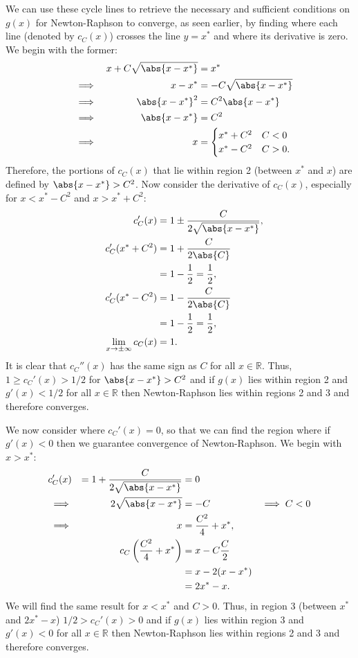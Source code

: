 \documentclass{book}
\begin{document}
We can use these cycle lines to retrieve the necessary and sufficient conditions on $g(x)$ for Newton-Raphson to converge, as seen earlier, by finding where each line (denoted by $c_C(x)$) crosses the line $y=x^*$ and where its derivative is zero.
We begin with the former:
\begin{align*}
&& && x + C \sqrt{\abs{x - x^*}} & = x^* \\
&& \implies && x - x^*           & = -C \sqrt{\abs{x - x^*}} \\
&& \implies && \abs{x - x^*}^2   & = C^2 \abs{x - x^*} \\
&& \implies && \abs{x - x^*}     & = C^2 \\
&& \implies && x                 & = \begin{cases} x^* + C^2 & C < 0 \\ x^* - C^2 & C > 0. \end{cases}
\end{align*}
Therefore, the portions of $c_C(x)$ that lie within region 2 (between $x^*$ and $x$) are defined by $\abs{x - x^*} > C^2$.
Now consider the derivative of $c_C(x)$, especially for $x < x^*-C^2$ and $x > x^* + C^2$:
\begin{align*}
&& c_C'(x) & = 1 \pm \frac{C}{2 \sqrt{\abs{x-x^*}}}, \\
&& c_C'(x^* + C^2) & = 1 + \frac{C}{2 \abs{C}} \\
&&                 & = 1 - \frac{1}{2} = \frac{1}{2}, \\
&& c_C'(x^* - C^2) & = 1 - \frac{C}{2 \abs{C}} \\
&&                 & = 1 - \frac{1}{2} = \frac{1}{2}, \\
&& \lim_{x \rightarrow \pm \infty} c_C(x)  & = 1 .
\end{align*}
It is clear that $c_C''(x)$ has the same sign as $C$ for all $x \in \mathbb{R}$.
Thus, $1 \geq c_C'(x) > 1/2$ for $\abs{x - x^*} > C^2$ and if $g(x)$ lies within region 2 and $g'(x) < 1/2$ for all $x \in \mathbb{R}$ then Newton-Raphson lies within regions 2 and 3 and therefore converges.

We now consider where $c_C'(x) = 0$, so that we can find the region where if $g'(x) < 0$ then we guarantee convergence of Newton-Raphson.
We begin with $x > x^*$:
\begin{align*}
c_C'(x)  && = 1 + \frac{C}{2 \sqrt{\abs{x-x^*}}} & = 0 \\
\implies && 2 \sqrt{\abs{x-x^*}}                 & = -C & \implies C<0 \\
\implies && x                                    & = \frac{C^2}{4} + x^*, \\
         && c_C \left (\frac{C^2}{4} + x^* \right ) & = x - C \frac{C}{2} \\
&& & = x - 2 (x - x^*) \\
&& & = 2 x^* - x .
\end{align*}
We will find the same result for $x < x^*$ and $C > 0$.
Thus, in region 3 (between $x^*$ and $2 x^* - x$) $1/2 > c_C'(x) > 0$ and if $g(x)$ lies within region 3 and $g'(x) < 0$ for all $x \in \mathbb{R}$ then Newton-Raphson lies within regions 2 and 3 and therefore converges.
\end{document}
